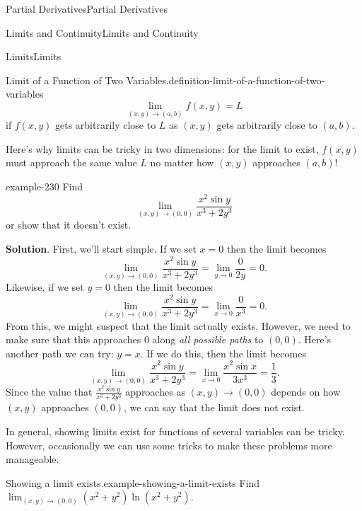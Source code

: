 \documentclass[10pt,]{book}
\numberwithin{equation}{section}
\begin{document}
\begin{chapterptx}{Partial Derivatives}{}{Partial Derivatives}{}{}
\begin{sectionptx}{Limits and Continuity}{}{Limits and Continuity}{}{}
\begin{subsectionptx}{Limits}{}{Limits}{}{}
\begin{definition}{Limit of a Function of Two Variables.}{definition-limit-of-a-function-of-two-variables}
\begin{equation*}
\lim_{(x,y)\to(a,b)}f(x,y) = L
\end{equation*}
if \(f(x,y)\) gets arbitrarily close to \(L\) as \((x,y)\) gets arbitrarily close to \((a,b)\).%
\end{definition}
\hypertarget{p-1125}{}%
Here's why limits can be tricky in two dimensions: for the limit to exist, \(f(x,y)\) must approach the same value \(L\) no matter how \((x,y)\) approaches \((a,b)\)!%
\begin{example}{}{example-230}%
\hypertarget{p-1126}{}%
Find%
\begin{equation*}
\lim_{(x,y)\to(0,0)}\frac{x^{2}\sin y}{x^{3}+2y^{3}}
\end{equation*}
or show that it doesn't exist.%
\par\smallskip%
\noindent\textbf{Solution}.\hypertarget{solution-172}{}\quad%
\hypertarget{p-1127}{}%
First, we'll start simple. If we set \(x = 0\) then the limit becomes%
\begin{equation*}
\lim_{(x,y)\to(0,0)}\frac{x^{2}\sin y}{x^{3}+2y^{3}} = \lim_{y\to0}\frac{0}{2y} = 0.
\end{equation*}
Likewise, if we set \(y=0\) then the limit becomes%
\begin{equation*}
\lim_{(x,y)\to(0,0)}\frac{x^{2}\sin y}{x^{3}+2y^{3}} = \lim_{x\to0}\frac{0}{x^{3}} = 0.
\end{equation*}
From this, we might suspect that the limit actually exists. However, we need to make sure that this approaches \(0\) along \emph{all possible paths} to \((0,0)\). Here's another path we can try: \(y = x\). If we do this, then the limit becomes%
\begin{equation*}
\lim_{(x,y)\to(0,0)}\frac{x^{2}\sin y}{x^{3}+2y^{3}} = \lim_{x\to0}\frac{x^{2}\sin x}{3x^{3}} = \frac{1}{3}.
\end{equation*}
Since the value that \(\frac{x^{2}\sin y}{x^{3}+2y^{3}}\) approaches as \((x,y)\to(0,0)\) depends on how \((x,y)\) approaches \((0,0)\), we can say that the limit does not exist.%
\end{example}
\hypertarget{p-1128}{}%
In general, showing limits exist for functions of several variables can be tricky. However, occasionally we can use some tricks to make these problems more manageable.%
\begin{example}{Showing a limit exists.}{example-showing-a-limit-exists}%
\hypertarget{p-1129}{}%
Find \(\lim_{(x,y)\to(0,0)}(x^{2}+y^{2})\ln(x^{2}+y^{2})\).%
\par\smallskip%

\end{example}
\end{subsectionptx}
\end{sectionptx}
\end{chapterptx}
\end{document}
